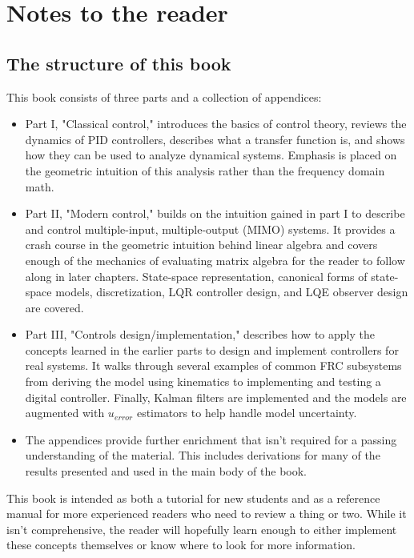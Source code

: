 
\setcounter{chapter}{-1}
\chapter{Notes to the reader}

\section{The structure of this book}

This book consists of three parts and a collection of appendices:

\begin{itemize}
  \item Part I, "Classical control," introduces the basics of control theory,
    reviews the dynamics of PID controllers, describes what a transfer function
    is, and shows how they can be used to analyze dynamical systems. Emphasis is
    placed on the geometric intuition of this analysis rather than the frequency
    domain math.
  \item Part II, "Modern control," builds on the intuition gained in part I to
    describe and control multiple-input, multiple-output (MIMO) systems. It
    provides a crash course in the geometric intuition behind linear algebra and
    covers enough of the mechanics of evaluating matrix algebra for the reader
    to follow along in later chapters. State-space representation, canonical
    forms of state-space models, discretization, LQR controller design, and LQE
    observer design are covered.
  \item Part III, "Controls design/implementation," describes how to apply the
    concepts learned in the earlier parts to design and implement controllers
    for real systems. It walks through several examples of common FRC subsystems
    from deriving the model using kinematics to implementing and testing a
    digital controller. Finally, Kalman filters are implemented and the models
    are augmented with $u_{error}$ estimators to help handle model uncertainty.
  \item The appendices provide further enrichment that isn't required for a
    passing understanding of the material. This includes derivations for many of
    the results presented and used in the main body of the book.
\end{itemize}

This book is intended as both a tutorial for new students and as a reference
manual for more experienced readers who need to review a thing or two. While it
isn't comprehensive, the reader will hopefully learn enough to either implement
these concepts themselves or know where to look for more information.

